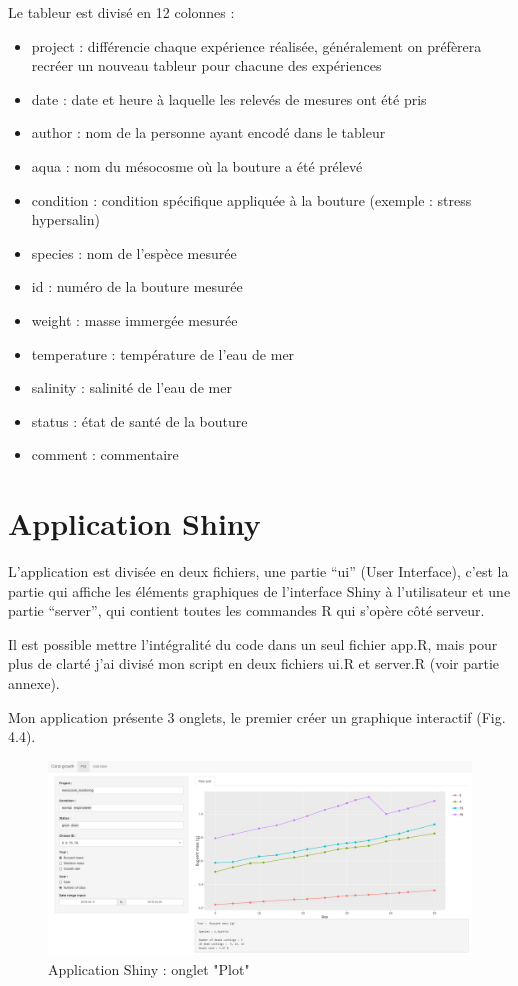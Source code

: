 \documentclass[]{report}
\providecommand{\tightlist}{%
  \setlength{\itemsep}{0pt}\setlength{\parskip}{0pt}}
\begin{document}
Le tableur est divisé en 12 colonnes :

\begin{itemize}
\tightlist
\item
  project : différencie chaque expérience réalisée, généralement on
  préfèrera recréer un nouveau tableur pour chacune des expériences
\item
  date : date et heure à laquelle les relevés de mesures ont été pris
\item
  author : nom de la personne ayant encodé dans le tableur
\item
  aqua : nom du mésocosme où la bouture a été prélevé
\item
  condition : condition spécifique appliquée à la bouture (exemple :
  stress hypersalin)
\item
  species : nom de l'espèce mesurée
\item
  id : numéro de la bouture mesurée
\item
  weight : masse immergée mesurée
\item
  temperature : température de l'eau de mer
\item
  salinity : salinité de l'eau de mer
\item
  status : état de santé de la bouture
\item
  comment : commentaire
\end{itemize}

\section{Application Shiny}\label{application-shiny}

L'application est divisée en deux fichiers, une partie ``ui'' (User
Interface), c'est la partie qui affiche les éléments graphiques de
l'interface Shiny à l'utilisateur et une partie ``server'', qui contient
toutes les commandes R qui s'opère côté serveur.

Il est possible mettre l'intégralité du code dans un seul fichier app.R,
mais pour plus de clarté j'ai divisé mon script en deux fichiers ui.R et
server.R (voir partie annexe).

\vspace{1 cm}

Mon application présente 3 onglets, le premier créer un graphique
interactif (Fig. 4.4).

\begin{figure}[h!]
\includegraphics[]{../image/notebook-plot1.PNG}
\caption{Application Shiny : onglet "Plot"}
\end{figure}
\end{document}
